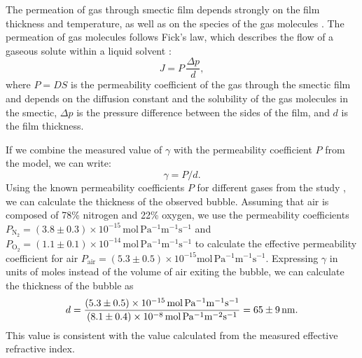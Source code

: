 \documentclass[a4paper,12pt]{article}
\begin{document}
	The permeation of gas through smectic film depends strongly on the film thickness and temperature, as well as on the species of the gas molecules \cite{ishii2009gas, li2002gas}. The permeation of gas molecules follows Fick's law, which describes the flow of a gaseous solute within a liquid solvent \cite{ishii2009gas}:
	\begin{equation}
	J=P\,\frac{\Delta p}{d},
	\end{equation}
	where $P=DS$ is the permeability coefficient of the gas through the smectic film and depends on the diffusion constant and the solubility of the gas molecules in the smectic, $\Delta p$ is the pressure difference between the sides of the film, and $d$ is the film thickness.
 
	If we combine the measured value of $\gamma$ with the permeability coefficient $P$ from the model, we can write:
	\begin{equation}
	\gamma=P/d.
	\end{equation}
	Using the known permeability coefficients $P$ for different gases from the study \cite{ishii2009gas}, we can calculate the thickness of the observed bubble.
	Assuming that air is composed of 78\% nitrogen and 22\% oxygen, we use the permeability coefficients $P_{\mathrm{N_2}}=(3.8\pm0.3)\times 10^{-15}\,\mathrm{mol\,Pa^{-1}m^{-1}s^{-1}}$ and $P_{\mathrm{O_2}}=(1.1\pm0.1)\times 10^{-14}\,\mathrm{mol\,Pa^{-1}m^{-1}s^{-1}}$ to calculate the effective permeability coefficient for air $P_{\mathrm{air}}=(5.3\pm0.5)\times 10^{-15}\mathrm{mol\,Pa^{-1}m^{-1}s^{-1}}$.
	Expressing $\gamma$ in units of moles instead of the volume of air exiting the bubble, we can calculate the thickness of the bubble as
	\begin{equation}
	d=\frac{(5.3\pm0.5)\times 10^{-15}\,\mathrm{mol\,Pa^{-1}m^{-1}s^{-1}}}{(8.1\pm0.4)\times 10^{-8}\,\mathrm{mol\,Pa^{-1}m^{-2}s^{-1}}}= \SI{65\pm9}{nm}.
	\end{equation}
	This value is consistent with the value calculated from the measured effective refractive index.
\end{document}
